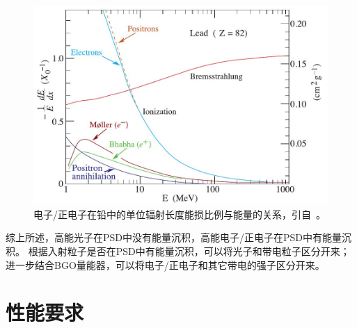\begin{figure}[h!]
\centering
\includegraphics[width=0.8\linewidth]{chap/description/fig/electron_energyloss}
\caption{电子/正电子在铅中的单位辐射长度能损比例与能量的关系，引自~\parencite{pdg_book}。}
\label{fig:ch2:electron_energyloss}
\end{figure}

综上所述，高能光子在PSD中没有能量沉积，高能电子/正电子在PSD中有能量沉积。
根据入射粒子是否在PSD中有能量沉积，可以将光子和带电粒子区分开来；进一步结合BGO量能器，可以将电子/正电子和其它带电的强子区分开来。

\section{性能要求}
\label{sec:psd_requirements}

